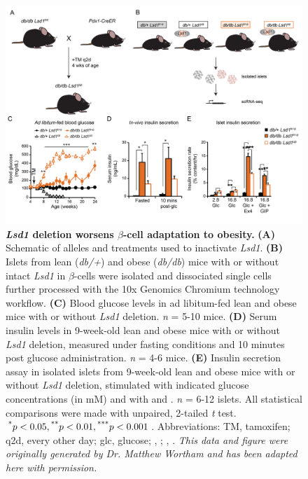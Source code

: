 \begin{figure}[H]
    \centering
    \includegraphics[width=\linewidth]{Chapter5/Fig/F3-20-01.png}
    \caption[\textit{Lsd1} deletion worsens $\beta$-cell adaptation to obesity]{\textbf{\textit{Lsd1} deletion worsens $\beta$-cell adaptation to obesity.}
    \textbf{(A)} Schematic of alleles and treatments used to inactivate \textit{Lsd1}. \textbf{(B)} Islets from lean (\textit{db/+}) and obese (\textit{db/db}) mice with or without intact \textit{Lsd1} in $\beta$-cells were isolated and dissociated single cells further processed with the 10x Genomics Chromium technology workflow. \textbf{(C)} Blood glucose levels in ad libitum-fed lean and obese mice with or without \textit{Lsd1} deletion. \textit{n} = 5-10 mice. \textbf{(D)} Serum insulin levels in 9-week-old lean and obese mice with or without \textit{Lsd1} deletion, measured under fasting conditions and 10 minutes post glucose administration. \textit{n} = 4-6 mice. \textbf{(E)} Insulin secretion assay in isolated islets from 9-week-old lean and obese mice with or without \textit{Lsd1} deletion, stimulated with indicated glucose concentrations (in mM) and with  and . \textit{n} = 6-12 islets. All statistical comparisons were made with unpaired, 2-tailed \textit{t} test. $\textsuperscript{*} p < 0.05, \textsuperscript{**} p < 0.01, \textsuperscript{***} p < 0.001$. Abbreviations: TM, tamoxifen; q2d, every other day; glc, glucose; , ; , . \textit{This data and figure were originally generated by Dr. Matthew Wortham and has been adapted here with permission.}}
    \label{fig:chp3_valid_study_metab}
\end{figure}





